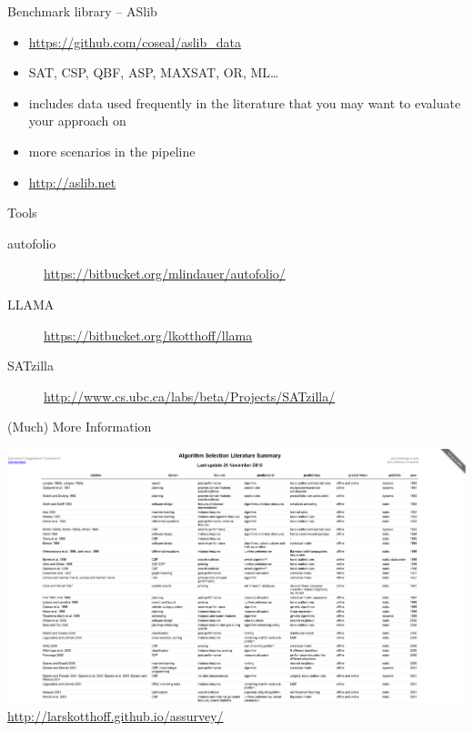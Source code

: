 \begin{frame}[c]{Benchmark library -- ASlib }
\begin{itemize}
\item \url{https://github.com/coseal/aslib_data}
\item SAT, CSP, QBF, ASP, MAXSAT, OR, ML\ldots
\item includes data used frequently in the literature that you may want to
    evaluate your approach on
\item more scenarios in the pipeline
\item \url{http://aslib.net}\\[1em]
\end{itemize}
\end{frame}

\begin{frame}[c]{Tools}
\begin{description}
\item[autofolio] \url{https://bitbucket.org/mlindauer/autofolio/}
\item[LLAMA] \url{https://bitbucket.org/lkotthoff/llama}
\item[SATzilla]
 \footnotesize{\url{http://www.cs.ubc.ca/labs/beta/Projects/SATzilla/}}
\end{description}
\end{frame}

\begin{frame}[c]{(Much) More Information }
\begin{center}
\includegraphics[height=.6\textheight]{images/survey}\\
\url{http://larskotthoff.github.io/assurvey/}
\end{center}
\end{frame}


